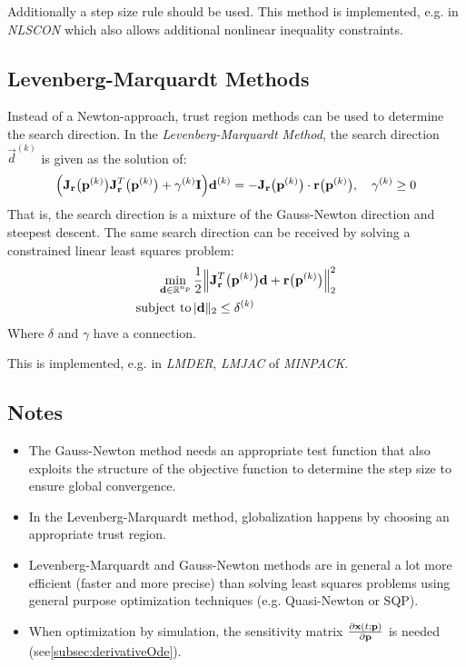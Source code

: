 			Additionally a step size rule should be used. This method is implemented, e.g. in \emph{NLSCON} which also allows additional nonlinear inequality constraints.

		\subsection{Levenberg-Marquardt Methods}
			Instead of a Newton-approach, trust region methods can be used to determine the search direction. In the \emph{Levenberg-Marquardt Method}, the search direction \(\vec{d}^{(k)}\) is given as the solution of:
			\begin{align*}
				\Big( \boldsymbol{\mathrm{J}}_{\boldsymbol{\mathrm{r}}}\big(\boldsymbol{\mathrm{p}}^{(k)}\big) \boldsymbol{\mathrm{J}}_{\boldsymbol{\mathrm{r}}}^T\big(\boldsymbol{\mathrm{p}}^{(k)}\big) + \gamma^{(k)} \boldsymbol{\mathrm{I}} \Big) \boldsymbol{\mathrm{d}}^{(k)} = -\boldsymbol{\mathrm{J}}_{\boldsymbol{\mathrm{r}}}\big(\boldsymbol{\mathrm{p}}^{(k)}\big) \cdot \boldsymbol{\mathrm{r}}\big(\boldsymbol{\mathrm{p}}^{(k)}\big),\quad \gamma^{(k)} \geq 0
			\end{align*}
			That is, the search direction is a mixture of the Gauss-Newton direction and steepest descent. The same search direction can be received by solving a constrained linear least squares problem:
			\begin{align*}
				\min_{\boldsymbol{\mathrm{d}} \in \mathbb{R}^{n_p}} &\, \frac{1}{2} \Big\lVert \boldsymbol{\mathrm{J}}_{\boldsymbol{\mathrm{r}}}^T\big(\boldsymbol{\mathrm{p}}^{(k)}\big) \boldsymbol{\mathrm{d}} + \boldsymbol{\mathrm{r}}\big(\boldsymbol{\mathrm{p}}^{(k)}\big) \Big\rVert_2^2 \\
				\mathrm{subject~to} &\,
					\lvert \boldsymbol{\mathrm{d}} \rVert_2 \leq \delta^{(k)}
			\end{align*}
			Where \(\delta\) and \(\gamma\) have a connection.
			
			This is implemented, e.g. in \emph{LMDER}, \emph{LMJAC} of \emph{MINPACK}.
		
		\subsection{Notes}
			\begin{itemize}
				\item The Gauss-Newton method needs an appropriate test function that also exploits the structure of the objective function to determine the step size to ensure global convergence.
				\item In the Levenberg-Marquardt method, globalization happens by choosing an appropriate trust region.
				\item Levenberg-Marquardt and Gauss-Newton methods are in general a lot more efficient (faster and more precise) than solving least squares problems using general purpose optimization techniques (e.g. Quasi-Newton or SQP).
				\item When optimization by simulation, the sensitivity matrix \( \pdv{\boldsymbol{\mathrm{x}}(t; \boldsymbol{\mathrm{p}})}{\boldsymbol{\mathrm{p}}} \) is needed (see\autoref{subsec:derivativeOde}).
			\end{itemize}

